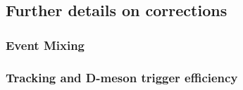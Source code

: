 \subsection{Further details on corrections}
\subsubsection{Event Mixing}

\newpage
\subsubsection{Tracking and D-meson trigger efficiency}


